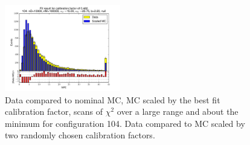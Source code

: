\begin{figure}[htbp]
\begin{center}
\includegraphics[width=0.45\textwidth]{../FIGURES/104/FIG_Fit_result_for_calibration_factor_of_0_460.pdf} 
\caption{Data compared to nominal MC, MC scaled by the best fit calibration factor, scans of $\chi^2$ over a large range and about the minimum for configuration 104. Data compared to MC scaled by two randomly chosen calibration factors.} 
\label{tab:best_104} 
\end{center} \end{figure} 

